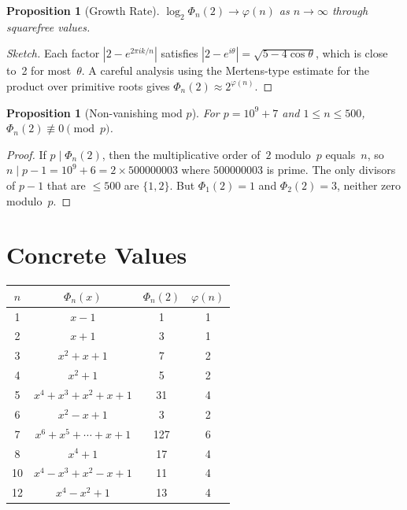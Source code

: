 \documentclass[11pt]{article}
\newtheorem{proposition}[theorem]{Proposition}
\begin{document}
\begin{proposition}[Growth Rate]
$\log_2 \Phi_n(2) \to \varphi(n)$ as $n \to \infty$ through squarefree values.
\end{proposition}

\begin{proof}[Sketch]
Each factor $|2 - e^{2\pi i k/n}|$ satisfies $|2 - e^{i\theta}| = \sqrt{5 - 4\cos\theta}$, which is close to~2 for most~$\theta$. A careful analysis using the Mertens-type estimate for the product over primitive roots gives $\Phi_n(2) \approx 2^{\varphi(n)}$.
\end{proof}

\begin{proposition}[Non-vanishing mod $p$]
\label{prop:nonvanish}
For $p = 10^9 + 7$ and $1 \le n \le 500$, $\Phi_n(2) \not\equiv 0 \pmod{p}$.
\end{proposition}

\begin{proof}
If $p \mid \Phi_n(2)$, then the multiplicative order of~$2$ modulo~$p$ equals~$n$, so $n \mid p - 1 = 10^9 + 6 = 2 \times 500000003$ where $500000003$ is prime. The only divisors of $p - 1$ that are $\le 500$ are $\{1, 2\}$. But $\Phi_1(2) = 1$ and $\Phi_2(2) = 3$, neither zero modulo~$p$.
\end{proof}

\section{Concrete Values}

\begin{center}
\begin{tabular}{cccc}
\toprule
$n$ & $\Phi_n(x)$ & $\Phi_n(2)$ & $\varphi(n)$ \\
\midrule
1  & $x - 1$                                 & 1    & 1 \\
2  & $x + 1$                                 & 3    & 1 \\
3  & $x^2 + x + 1$                           & 7    & 2 \\
4  & $x^2 + 1$                               & 5    & 2 \\
5  & $x^4 + x^3 + x^2 + x + 1$              & 31   & 4 \\
6  & $x^2 - x + 1$                           & 3    & 2 \\
7  & $x^6 + x^5 + \cdots + x + 1$           & 127  & 6 \\
8  & $x^4 + 1$                               & 17   & 4 \\
10 & $x^4 - x^3 + x^2 - x + 1$              & 11   & 4 \\
12 & $x^4 - x^2 + 1$                         & 13   & 4 \\
\bottomrule
\end{tabular}
\end{center}
\end{document}
